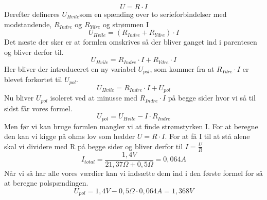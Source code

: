 \begin{equation*}
    U = R \cdot I
\end{equation*}
Derefter defineres \begin{math}U_{Hvile}\end{math}som en spænding over to serieforbindelser med modstandende, \begin{math}R_{Indre}\end{math} og \begin{math}R_{Ydre}\end{math} og strømmen I
\begin{equation*}
    U_{Hvile} = (R_{Indre} + R_{Ydre}) \cdot I
\end{equation*}
Det næste der sker er at formlen omskrives så der bliver ganget ind i parentesen og bliver derfor til.
\begin{equation*}
    U_{Hvile} = R_{Indre} \cdot I + R_{Ydre} \cdot I
\end{equation*}
Her bliver der introduceret en ny variabel $U_{pol}$, som kommer fra at $R_{Ydre} \cdot I$ er blevet forkortet til $U_{pol}$.
\begin{equation*}
    U_{Hvile} = R_{Indre} \cdot I + U_{pol}
\end{equation*}
Nu bliver $U_{pol}$ isoleret ved at minusse med $R_{Indre} \cdot I$ på begge sider hvor vi så til sidst får vores formel.
\begin{equation*}
    U_{pol}=U_{Hvile}-I\cdot R_{Indre}
\end{equation*}
Men før vi kan bruge formlen mangler vi at finde strømstyrken I. For at beregne den kan vi kigge på ohms lov som hedder $U = R \cdot I$. For at få I til at stå alene skal vi dividere med R på begge sider og bliver derfor til $I = \frac{U}{R}$
\begin{equation*}
    I_{total}=\frac{1,4V}{21,37\Omega+0,5\Omega}=0,064A
\end{equation*}
Når vi så har alle vores værdier kan vi indsætte dem ind i den første formel for så at beregne polspændingen.
\begin{equation*}
    U_{pol}=1,4V-0,5\Omega\cdot 0,064A=1,368V
\end{equation*}
\newpage